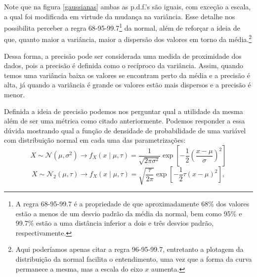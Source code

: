 \documentclass{article}
\begin{document}
Note que na figura \ref{gaussianas} ambas as p.d.f.'s são iguais, com exceção a escala, a qual foi modificada em virtude da mudança na variância. Esse detalhe nos possibilita perceber a regra 68-95-99.7\footnote{A regra 68-95-99.7 é a propriedade de que aproximadamente 68\% dos valores estão a menos de um desvio padrão da média da normal, bem como 95\% e 99.7\% estão a uma distância inferior a dois e três desvios padrão, respectivamente.} da normal, além de reforçar a ideia de que, quanto maior a variância, maior a dispersão dos valores em torno da média.\footnote{Aqui poderíamos apenas citar a regra 96-95-99.7, entretanto a plotagem da distribuição da normal facilita o entendimento, uma vez que a forma da curva permanece a mesma, mas a escala do eixo $x$ aumenta.}

Dessa forma, a precisão pode ser considerada uma medida de proximidade dos dados, pois a precisão é definida como o recíproco da variância. Assim, quando temos uma variância baixa os valores se encontram perto da média e a precisão é alta, já quando a variância é grande os valores estão mais dispersos e a precisão é menor.

Definida a ideia de precisão podemos nos perguntar qual a utilidade da mesma além de ser uma métrica como citado anteriormente. Podemos responder a essa dúvida mostrando qual a função de densidade de probabilidade de uma variável com distribuição normal em cada uma das parametrizações:
\[X \sim \mathcal{N}(\mu, \sigma^2) \longrightarrow f_X(x \mid \mu, \tau) = \dfrac{1}{\sqrt{2\pi \sigma^2}}\exp{\left[-\dfrac{1}{2}\left(\dfrac{x - \mu}{\sigma}\right)^2\right]}\]
\[X \sim \mathcal{N}_2(\mu, \tau) \longrightarrow f_X(x \mid \mu, \tau) = \sqrt{\dfrac{\tau}{2\pi}}\exp{\left[-\dfrac{1}{2}\tau(x - \mu)^2\right]},\]
\end{document}
